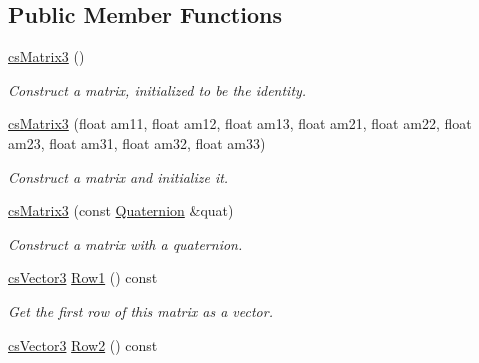 \subsection*{Public Member Functions}
\begin{DoxyCompactItemize}
\item 
\hyperlink{classcsMatrix3_a3ec397749c3898a54479d7779fcc3d22}{cs\+Matrix3} ()\hypertarget{classcsMatrix3_a3ec397749c3898a54479d7779fcc3d22}{}\label{classcsMatrix3_a3ec397749c3898a54479d7779fcc3d22}

\begin{DoxyCompactList}\small\item\em Construct a matrix, initialized to be the identity. \end{DoxyCompactList}\item 
\hyperlink{classcsMatrix3_a51401dc3d8a370c4c89c671cf4a696f2}{cs\+Matrix3} (float am11, float am12, float am13, float am21, float am22, float am23, float am31, float am32, float am33)\hypertarget{classcsMatrix3_a51401dc3d8a370c4c89c671cf4a696f2}{}\label{classcsMatrix3_a51401dc3d8a370c4c89c671cf4a696f2}

\begin{DoxyCompactList}\small\item\em Construct a matrix and initialize it. \end{DoxyCompactList}\item 
\hyperlink{classcsMatrix3_aa6696423c3716c10b0a9f3fbaab048e1}{cs\+Matrix3} (const \hyperlink{structQuaternion}{Quaternion} \&quat)\hypertarget{classcsMatrix3_aa6696423c3716c10b0a9f3fbaab048e1}{}\label{classcsMatrix3_aa6696423c3716c10b0a9f3fbaab048e1}

\begin{DoxyCompactList}\small\item\em Construct a matrix with a quaternion. \end{DoxyCompactList}\item 
\hyperlink{classcsVector3}{cs\+Vector3} \hyperlink{classcsMatrix3_a841bb7ccfb239c7766c4ce90075e5051}{Row1} () const \hypertarget{classcsMatrix3_a841bb7ccfb239c7766c4ce90075e5051}{}\label{classcsMatrix3_a841bb7ccfb239c7766c4ce90075e5051}

\begin{DoxyCompactList}\small\item\em Get the first row of this matrix as a vector. \end{DoxyCompactList}\item 
\hyperlink{classcsVector3}{cs\+Vector3} \hyperlink{classcsMatrix3_a37412d02aab4bdca56afe69eab32c052}{Row2} () const \hypertarget{classcsMatrix3_a37412d02aab4bdca56afe69eab32c052}{}\label{classcsMatrix3_a37412d02aab4bdca56afe69eab32c052}


\end{DoxyCompactItemize}
